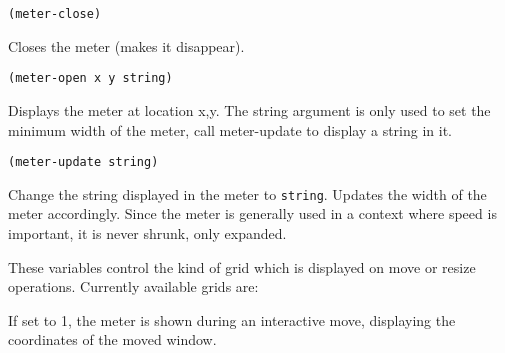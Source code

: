         
{\usagefont\begin{verbatim}
(meter-close)
\end{verbatim}}\usageupspace

Closes the meter (makes it disappear).

        
{\usagefont\begin{verbatim}
(meter-open x y string)
\end{verbatim}}\usageupspace

Displays the meter at location x,y. The string argument is only used to set
the minimum width of the meter, call meter-update to display a string in it.

        
{\usagefont\begin{verbatim}
(meter-update string)
\end{verbatim}}\usageupspace

Change the string displayed in the meter to \verb"string". Updates the width
of the meter accordingly. Since the meter is generally used in a context
where speed is important, it is never shrunk, only expanded.

        

These variables control the kind of grid which is displayed on move or
resize operations. Currently available grids are:




If set to 1, the meter is shown during an interactive move,
displaying the coordinates of the moved window.

